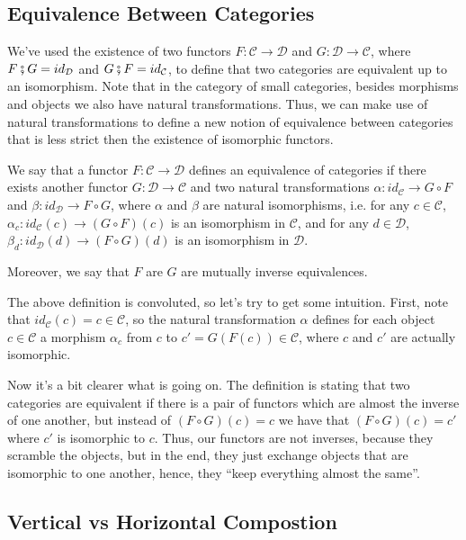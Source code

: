 \subsection{Equivalence Between Categories}

We've used the existence of two functors $F:\mathcal C \to \mathcal D$ and $G:\mathcal D \to \mathcal C$,
where $F \fatsemi G = id_\mathcal D$ and $G \fatsemi F = id_\mathcal C$,
to define that two categories are equivalent up to an isomorphism.
Note that in the category of small categories, besides morphisms and objects we also
have natural transformations. Thus, we can make use of natural transformations to
define a new notion of equivalence between categories that is less strict then
the existence of isomorphic functors.

\begin{definition}
	We say that a functor $F:\mathcal C \to \mathcal D$ defines an equivalence of
	categories if there exists another functor $G:\mathcal D \to \mathcal C$ and
	two natural transformations
	$\alpha: id_\mathcal C \to G \circ F$ and
	$\beta: id_\mathcal D \to F \circ G$, where $\alpha$ and $\beta$ are natural isomorphisms,
	i.e. for any $c \in \mathcal C$,
	$\alpha_c:id_\mathcal C(c) \to (G \circ F)(c)$ is an
	isomorphism in $\mathcal C$, and for any $d \in \mathcal D$,
	$\beta_d:id_\mathcal D(d) \to (F \circ G)(d)$ is an isomorphism in $\mathcal D$.

	Moreover, we say that $F$ are $G$ are mutually inverse equivalences.
	\label{def:EquivalenceCategories}
\end{definition}

The above definition is convoluted, so let's try to get some intuition.
First, note that $id_\mathcal C(c) = c \in \mathcal C$, so the natural transformation
$\alpha$ defines for each object $c \in \mathcal C$ a morphism $\alpha_c$ from $c$
to $c' = G(F(c)) \in \mathcal C$, where $c$ and $c'$ are actually isomorphic.

Now it's a bit clearer what is going on. The definition is stating that two
categories are equivalent if there is a pair of functors which are almost the inverse
of one another, but instead of $(F \circ G)(c) = c$ we have that
$(F \circ G )(c) = c'$  where $c'$ is isomorphic to $c$.
Thus, our functors are not inverses, because they scramble the objects, but in the end,
they just exchange objects that are isomorphic to one another, hence, they ``keep everything
almost the same''.

\subsection{Vertical vs Horizontal Compostion}

